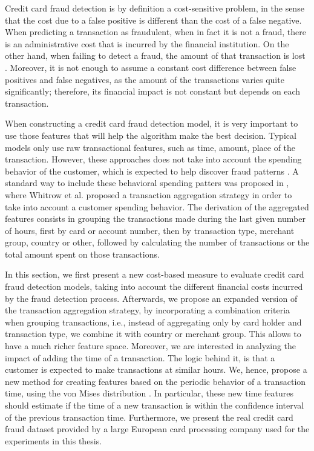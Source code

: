   Credit card fraud detection is by definition a cost-sensitive problem, in the sense that the 
  cost  due to a false positive is different than the cost of a false negative. When predicting a   
  transaction   as fraudulent, when in fact it is not a fraud, there is an administrative cost that 
  is incurred by  the financial institution. On the other hand, when failing to detect a fraud, the 
  amount of that  transaction is lost \citep{Hand2007a}. Moreover, it is not enough  to assume a  
  constant cost   difference between false positives and false negatives, as the amount of the  
  transactions varies   quite significantly; therefore, its financial impact is not constant but  
  depends on each   transaction. 
  
  When constructing a credit card fraud detection model, it is very important to use those features 
  that will help the algorithm make the best decision. Typical models only use raw transactional 
  features, such as time, amount, place of the transaction. However, these approaches does not take 
  into account the spending behavior of the customer, which is expected to help discover fraud 
  patterns \citep{Gadi2008}. A standard way to include these behavioral spending patters was 
  proposed in \citep{Whitrow2008}, where Whitrow et al. proposed a transaction aggregation strategy 
  in order to take   into account a customer spending behavior. The derivation of the aggregated 
  features consists in grouping the transactions made during the last given number of hours, first 
  by card or account number, then by transaction type, merchant group, country or other, followed 
  by calculating  the number of transactions or the total amount spent on those transactions.
	
	In this section,  we first present a new cost-based measure to evaluate   credit card fraud 
  detection models, taking into account the different financial costs incurred by   the fraud 
  detection process. Afterwards, we propose an expanded version of the transaction 
  aggregation strategy, by  incorporating a combination criteria when grouping transactions, i.e., 
  instead of aggregating only  by card holder and transaction type, we combine it with 
  country or merchant group. This allows to have a much richer feature space. Moreover, we are 
  interested in analyzing the impact of adding the time of a transaction. The logic behind it, is 
  that a customer is expected to make transactions at similar hours. We, hence, propose a new 
  method for creating features  based on the  periodic behavior of a transaction time, using the 
  von Mises distribution \citep{Fisher1996}. In particular, these new time features should estimate 
  if the time of a new transaction is within the confidence interval of the  previous transaction 
  time. Furthermore, we present the real credit card fraud dataset 
  provided  by a large European card processing company used for the experiments in this 
  thesis.
  
